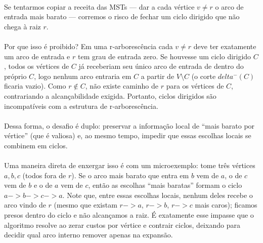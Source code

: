 \documentclass[12pt,a4paper]{article}
\def\emph#1{#1}%
\def\to{->}%
\def\delta{delta}%
\begin{document}
\paragraph{}
Se tentarmos copiar a receita das MSTs — dar a cada vértice \(v\neq r\) o arco de entrada mais barato — corremos o risco de fechar um \emph{ciclo dirigido} que não chega à raiz \(r\). 

\paragraph{}
Por que isso é proibido? Em uma r‑arborescência cada \(v\neq r\) deve ter exatamente um arco de entrada e \(r\) tem grau de entrada zero. Se houvesse um ciclo dirigido \(C\), todos os vértices de \(C\) já receberiam seu único arco de entrada de dentro do próprio \(C\), logo nenhum arco entraria em \(C\) a partir de \(V\setminus C\) (o corte \(\delta^-(C)\) ficaria vazio). Como \(r\notin C\), não existe caminho de \(r\) para os vértices de \(C\), contrariando a alcançabilidade exigida. Portanto, ciclos dirigidos são incompatíveis com a estrutura de r‑arborescência.

\paragraph{}
Dessa forma, o desafio é duplo: preservar a informação local de “mais barato por vértice” (que é valiosa) e, ao mesmo tempo, impedir que essas escolhas locais se combinem em ciclos. 

\paragraph{}
Uma maneira direta de enxergar isso é com um microexemplo: tome três vértices \(a,b,c\) (todos fora de \(r\)). Se o arco mais barato que entra em \(b\) vem de \(a\), o de \(c\) vem de \(b\) e o de \(a\) vem de \(c\), então as escolhas “mais baratas” formam o ciclo \(a\to b\to c\to a\). Note que, entre essas escolhas locais, nenhum deles recebe o arco vindo de \(r\) (mesmo que existam \(r\to a\), \(r\to b\), \(r\to c\) mais caros); ficamos presos dentro do ciclo e não alcançamos a raiz. É exatamente esse impasse que o algoritmo resolve ao zerar custos por vértice e contrair ciclos, deixando para decidir qual arco interno remover apenas na expansão.
\end{document}

